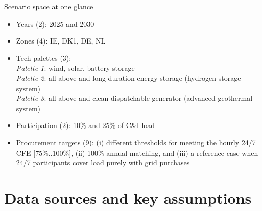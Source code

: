 \begin{frame}{Scenario space at one glance}
  \centering
  
  \begin{itemize}
      \item Years (2): 2025 and 2030
      \item Zones (4): IE, DK1, DE, NL
      \item Tech palettes (3): \\
          \emph{Palette 1}: wind, solar, battery  storage \\
          \emph{Palette 2}: all above and long-duration energy storage (hydrogen storage system) \\
          \emph{Palette 3}: all above and clean dispatchable generator (advanced geothermal system)
      \item Participation (2): 10\% and 25\% of C\&I load 
      \item Procurement targets (9): (i) different thresholds for
  meeting the hourly 24/7 CFE [75\%..100\%], (ii) 100\% annual matching, and (iii) a reference case when 24/7 participants cover load purely with grid purchases
  \end{itemize}
  
  \end{frame}


\section{Data sources and key assumptions}


